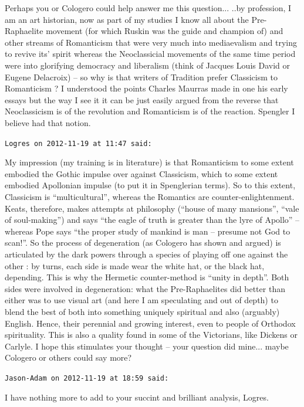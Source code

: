 \begin{footnotesize}
\begin{sffamily}
Perhaps you or Cologero could help answer me this question... ..by profession, I am an art historian, now as part of my studies I know all about the Pre-Raphaelite movement (for which Ruskin was the guide and champion of) and other streams of Romanticism that were very much into mediaevalism and trying to revive its' spirit whereas the Neoclassicial movements of the same time period were into glorifying democracy and liberalism (think of Jacques Louis David or Eugene Delacroix) -- so why is that writers of Tradition prefer Classicism to Romanticism ? I understood the points Charles Maurras made in one his early essays but the way I see it it can be just easily argued from the reverse that Neoclassicism is of the revolution and Romanticism is of the reaction. Spengler I believe had that notion.

\hfill

\texttt{Logres on 2012-11-19 at 11:47 said:}

My impression (my training is in literature) is that Romanticism to some extent embodied the Gothic impulse over against Classicism, which to some extent embodied Apollonian impulse (to put it in Spenglerian terms). So to this extent, Classicism is ``multicultural'', whereas the Romantics are counter-enlightenment. Keats, therefore, makes attempts at philosophy (``house of many mansions'', ``vale of soul-making'') and says ``the eagle of truth is greater than the lyre of Apollo'' -- whereas Pope says ``the proper study of mankind is man -- presume not God to scan!''. So the process of degeneration (as Cologero has shown and argued) is articulated by the dark powers through a species of playing off one against the other : by turns, each side is made wear the white hat, or the black hat, depending. This is why the Hermetic counter-method is ``unity in depth''. Both sides were involved in degeneration: what the Pre-Raphaelites did better than either was to use visual art (and here I am speculating and out of depth) to blend the best of both into something uniquely spiritual and also (arguably) English. Hence, their perennial and growing interest, even to people of Orthodox spirituality. This is also a quality found in some of the Victorians, like Dickens or Carlyle. I hope this stimulates your thought -- your question did mine... maybe Cologero or others could say more?

\hfill

\texttt{Jason-Adam on 2012-11-19 at 18:59 said:}

I have nothing more to add to your succint and brilliant analysis, Logres.


\end{sffamily}
\end{footnotesize}
